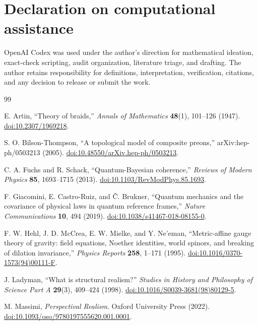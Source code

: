 \documentclass[11pt]{article}
\theoremstyle{definition}
\theoremstyle{remark}
\begin{document}
\section*{Declaration on computational assistance}

OpenAI Codex was used under the author's direction for mathematical ideation, exact-check scripting, audit organization, literature triage, and drafting. The author retains responsibility for definitions, interpretation, verification, citations, and any decision to release or submit the work.

\begin{thebibliography}{99}
\raggedright
\small

E. Artin, ``Theory of braids,'' \emph{Annals of Mathematics} \textbf{48}(1), 101--126 (1947). \href{https://doi.org/10.2307/1969218}{doi:10.2307/1969218}.

S. O. Bilson-Thompson, ``A topological model of composite preons,'' arXiv:hep-ph/0503213 (2005). \href{https://doi.org/10.48550/arXiv.hep-ph/0503213}{doi:10.48550/arXiv.hep-ph/0503213}.

C. A. Fuchs and R. Schack, ``Quantum-Bayesian coherence,'' \emph{Reviews of Modern Physics} \textbf{85}, 1693--1715 (2013). \href{https://doi.org/10.1103/RevModPhys.85.1693}{doi:10.1103/RevModPhys.85.1693}.

F. Giacomini, E. Castro-Ruiz, and \v{C}. Brukner, ``Quantum mechanics and the covariance of physical laws in quantum reference frames,'' \emph{Nature Communications} \textbf{10}, 494 (2019). \href{https://doi.org/10.1038/s41467-018-08155-0}{doi:10.1038/s41467-018-08155-0}.

F. W. Hehl, J. D. McCrea, E. W. Mielke, and Y. Ne'eman, ``Metric-affine gauge theory of gravity: field equations, Noether identities, world spinors, and breaking of dilation invariance,'' \emph{Physics Reports} \textbf{258}, 1--171 (1995). \href{https://doi.org/10.1016/0370-1573(94)00111-F}{doi:10.1016/0370-1573(94)00111-F}.

J. Ladyman, ``What is structural realism?'' \emph{Studies in History and Philosophy of Science Part A} \textbf{29}(3), 409--424 (1998). \href{https://doi.org/10.1016/S0039-3681(98)80129-5}{doi:10.1016/S0039-3681(98)80129-5}.

M. Massimi, \emph{Perspectival Realism}. Oxford University Press (2022). \href{https://doi.org/10.1093/oso/9780197555620.001.0001}{doi:10.1093/oso/9780197555620.001.0001}.


\end{thebibliography}
\end{document}
